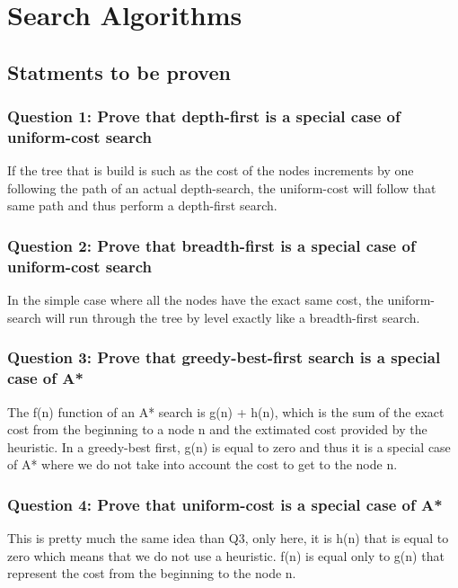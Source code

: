\documentclass[a4paper,10pt]{article}
\begin{document}
	\newpage
	
	\section{Search Algorithms}
		\subsection{Statments to be proven}
			\subsubsection{Question 1: Prove that depth-first is a special case of uniform-cost search}
				If the tree that is build is such as the cost of the nodes increments by one following the path of an actual depth-search, the uniform-cost will follow that same path and thus perform a depth-first search.
				
			\subsubsection{Question 2: Prove that breadth-first is a special case of uniform-cost search}	
				In the simple case where all the nodes have the exact same cost, the uniform-search will run through the tree by level exactly like a breadth-first search.
			\subsubsection{Question 3: Prove that greedy-best-first search is a special case of A*}
				The f(n) function of an A* search is g(n) + h(n), which is the sum of the exact cost from the beginning to a node n and the extimated cost provided by the heuristic. In a greedy-best first, g(n) is equal to zero and thus it is a special case of A* where we do not take into account the cost to get to the node n. 
			\subsubsection{Question 4: Prove that uniform-cost is a special case of A*}
				This is pretty much the same idea than Q3, only here, it is h(n) that is equal to zero which means that we do not use a heuristic. f(n) is equal only to g(n) that represent the cost from the beginning to the node n.
			
\end{document}
